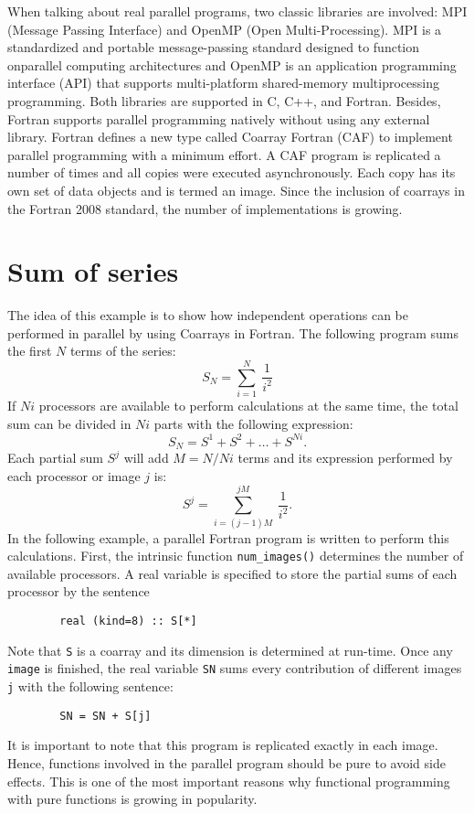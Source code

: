 When talking about real parallel programs, two classic libraries are involved: MPI (Message Passing Interface)
and OpenMP (Open Multi-Processing).
MPI is a standardized and portable message-passing standard designed to function onparallel computing architectures
and OpenMP is an application programming interface (API) 
that supports multi-platform shared-memory multiprocessing programming. 
Both libraries are supported  in C, C++, and Fortran.
Besides, Fortran supports parallel programming natively without using any external library. 
Fortran defines a new type called Coarray Fortran (CAF) to implement parallel programming with a minimum effort. 
A CAF program is replicated a number of times and all copies were executed asynchronously. 
Each copy has its own set of data objects and is termed an image. 
Since the inclusion of coarrays in the Fortran 2008 standard, the number of implementations is growing.


\newpage
\section{Sum of series}
The idea of this example is to show how independent operations can be performed in parallel by using 
Coarrays in Fortran. 
The following program sums the first $ N $ terms of the series: 
\begin{equation}
S_N = \sum _{i=1} ^N \ \frac{1}{i^2}
\end{equation}
If $ Ni$  processors are available to perform calculations at the same time, 
the total sum can be divided in $Ni$  parts  with the following expression: 
\begin{equation}
S_N = S^1 + S^2 +  \ldots + S^{Ni}.
\end{equation}
Each partial sum $ S^j $  will add $ M = N/Ni $ terms and 
its  expression performed by each processor or image $ j $ is: 
\begin{equation}
S^j = \sum _{i=(j-1)M} ^{j M}  \ \frac{1}{i^2}.
\end{equation}
In the following example, a parallel Fortran program is written to 
perform this calculations. 
First,  the intrinsic function \verb|num_images()| determines the number of available processors. 
A real variable is specified to store the partial sums of each processor by the sentence 
\begin{verbatim}
        real (kind=8) :: S[*] 
\end{verbatim} 
Note that \verb|S| is a coarray and its dimension is determined at run-time.  
Once any \verb|image| is finished, the real variable \verb|SN| sums every contribution of different 
images \verb|j| with the following sentence: 
\begin{verbatim}
        SN = SN + S[j] 
\end{verbatim} 
It is important to note that this program is replicated exactly in each image. Hence, functions involved in 
the parallel program should be pure to avoid side effects. This is  one of the most important 
reasons why functional programming with pure functions is growing in popularity. 

